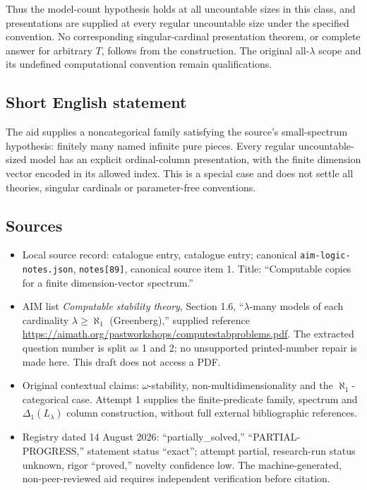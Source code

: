 \documentclass[11pt]{article}
\begin{document}
Thus the model-count hypothesis holds at all uncountable sizes in this class, and presentations are supplied at every regular uncountable size under the specified convention. No corresponding singular-cardinal presentation theorem, or complete answer for arbitrary \(T\), follows from the construction. The original all-\(\lambda\) scope and its undefined computational convention remain qualifications.
\subsection{Short English statement}
The aid supplies a noncategorical family satisfying the source's small-spectrum hypothesis: finitely many named infinite pure pieces. Every regular uncountable-sized model has an explicit ordinal-column presentation, with the finite dimension vector encoded in its allowed index. This is a special case and does not settle all theories, singular cardinals or parameter-free conventions.
\subsection{Sources}
\begin{itemize}
\item Local source record: catalogue entry, catalogue entry; canonical \texttt{aim-logic-notes.json}, \texttt{notes[89]}, canonical source item 1. Title: ``Computable copies for a finite dimension-vector spectrum.''
\item AIM list \emph{Computable stability theory}, Section 1.6, ``\(\lambda\)-many models of each cardinality \(\lambda\geq\aleph_1\) (Greenberg),'' supplied reference \url{https://aimath.org/pastworkshops/computestabproblems.pdf}. The extracted question number is split as 1 and 2; no unsupported printed-number repair is made here. This draft does not access a PDF.
\item Original contextual claims: \(\omega\)-stability, non-multidimensionality and the \(\aleph_1\)-categorical case. Attempt 1 supplies the finite-predicate family, spectrum and \(\Delta_1(L_\lambda)\) column construction, without full external bibliographic references.
\item Registry dated 14 August 2026: ``partially\_solved,'' ``PARTIAL-PROGRESS,'' statement status ``exact''; attempt partial, research-run status unknown, rigor ``proved,'' novelty confidence low. The machine-generated, non-peer-reviewed aid requires independent verification before citation.
\end{itemize}
\end{document}
